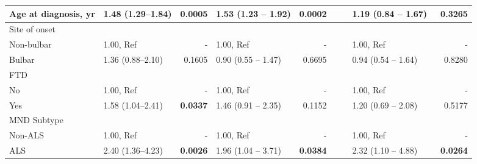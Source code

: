 \begin{sidewaystable}
{\begin{tabular}{|l|lr|lr|lr|lr|}
\hline
Age at diagnosis, yr & 1.48 (1.29--1.84) & \textbf{0.0005} & \textcolor[rgb]{0.2,0.2,0.2}{1.53 (1.23 -- 1.92)} & \textcolor[rgb]{0.2,0.2,0.2}{\textbf{0.0002}} & {\cellcolor[rgb]{0.753,0.753,0.753}} & {\cellcolor[rgb]{0.753,0.753,0.753}} & \textcolor[rgb]{0.2,0.2,0.2}{1.19 (0.84 -- 1.67)~} & \textcolor[rgb]{0.2,0.2,0.2}{0.3265} \\ 
\hline
Site of onset &  &  &  &  & {\cellcolor[rgb]{0.753,0.753,0.753}} & {\cellcolor[rgb]{0.753,0.753,0.753}} &  &  \\
\hspace{5mm}Non-bulbar & 1.00, Ref & - & 1.00, Ref & - & {\cellcolor[rgb]{0.753,0.753,0.753}} & {\cellcolor[rgb]{0.753,0.753,0.753}} & 1.00, Ref & - \\
\hspace{5mm}Bulbar & 1.36 (0.88--2.10) & 0.1605 & \textcolor[rgb]{0.2,0.2,0.2}{0.90 (0.55 -- 1.47)} & \textcolor[rgb]{0.2,0.2,0.2}{0.6695} & {\cellcolor[rgb]{0.753,0.753,0.753}} & {\cellcolor[rgb]{0.753,0.753,0.753}} & \textcolor[rgb]{0.2,0.2,0.2}{0.94 (0.54 -- 1.64)~} & \textcolor[rgb]{0.2,0.2,0.2}{0.8280} \\ 
\hline
FTD &  &  &  &  & {\cellcolor[rgb]{0.753,0.753,0.753}} & {\cellcolor[rgb]{0.753,0.753,0.753}} &  &  \\
\hspace{5mm}No & 1.00, Ref & - & 1.00, Ref & - & {\cellcolor[rgb]{0.753,0.753,0.753}} & {\cellcolor[rgb]{0.753,0.753,0.753}} & 1.00, Ref & - \\
\hspace{5mm}Yes & 1.58 (1.04--2.41) & \textbf{0.0337} & \textcolor[rgb]{0.2,0.2,0.2}{1.46 (0.91 -- 2.35)} & \textcolor[rgb]{0.2,0.2,0.2}{0.1152} & {\cellcolor[rgb]{0.753,0.753,0.753}} & {\cellcolor[rgb]{0.753,0.753,0.753}} & \textcolor[rgb]{0.2,0.2,0.2}{1.20 (0.69 -- 2.08)~} & \textcolor[rgb]{0.2,0.2,0.2}{0.5177} \\ 
\hline
MND Subtype &  &  &  &  & {\cellcolor[rgb]{0.753,0.753,0.753}} & {\cellcolor[rgb]{0.753,0.753,0.753}} &  &  \\
\hspace{5mm}Non-ALS & 1.00, Ref & - & 1.00, Ref & - & {\cellcolor[rgb]{0.753,0.753,0.753}} & {\cellcolor[rgb]{0.753,0.753,0.753}} & 1.00, Ref & - \\
\hspace{5mm}ALS & 2.40 (1.36--4.23) & \textbf{0.0026} & \textcolor[rgb]{0.2,0.2,0.2}{1.96 (1.04 -- 3.71)} & \textcolor[rgb]{0.2,0.2,0.2}{\textbf{0.0384}} & {\cellcolor[rgb]{0.753,0.753,0.753}} & {\cellcolor[rgb]{0.753,0.753,0.753}} & \textcolor[rgb]{0.2,0.2,0.2}{2.32 (1.10 -- 4.88)~} & \textcolor[rgb]{0.2,0.2,0.2}{\textbf{0.0264}} \\ 

\end{tabular}}
\end{sidewaystable}
